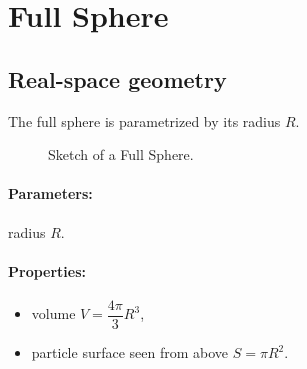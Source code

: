 

\newpage{\cleardoublepage}
\section{Full Sphere} 

\subsection{Real-space geometry}
The full sphere is parametrized by its radius $R$. 


\begin{figure}[ht]
\hfill
{}
\hfill
{}
\hfill
\caption{Sketch of a Full Sphere.}
\label{fig:fullsphere}
\end{figure}

\FloatBarrier

\paragraph{Parameters:} radius $R$.

\paragraph{Properties:}
\begin{itemize}
\item volume $V = \dfrac{4\pi}{3}R^3$,
\item particle surface seen from above $S= \pi R^2$.
\end{itemize}

